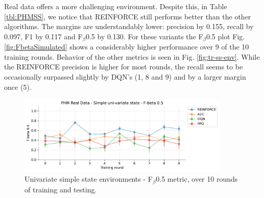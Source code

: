 \documentclass[a4paper, 12pt]{article}
\begin{document}
Real data offers a more challenging environment. Despite this, in Table \ref{tbl:PHMSS}, we notice that REINFORCE still performs better than the other algorithms. The margins are understandably lower: precision by 0.155, recall by 0.097, F1 by 0.117 and F$_\beta$0.5 by 0.130. For these variants the F$_\beta$0.5 plot Fig. \ref{fig:FbetaSimulated} shows a considerably higher performance over 9 of the 10 training rounds. Behavior of the other metrics is seen in Fig. \ref{fig:tr-ss-env}. While the REINFORCE precision is higher for most rounds, the recall seems to be occasionally surpassed slightly by DQN's (1, 8 and 9) and by a larger margin once (5).
\begin{figure}[h]
	\centering
	\includegraphics[width=0.9\textwidth]{Singevariable_F05.pdf}  
	\caption{Univariate simple state environments - F$_\beta$0.5 metric, over 10 rounds of training and testing.}
	\label{fig:FbetaPHMSS}
\end{figure}
\end{document}
